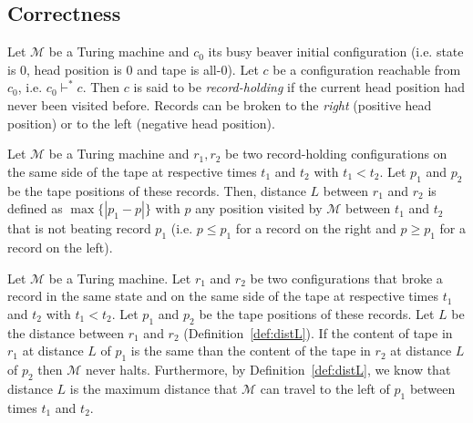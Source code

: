 \subsection{Correctness}

\begin{definition}\normalfont
  Let $\mathcal{M}$ be a Turing machine and $c_0$ its busy beaver initial configuration (i.e. state is 0, head position is 0 and tape is all-0).
  Let $c$ be a configuration reachable from $c_0$, i.e. $c_0 \vdash^* c$.
Then $c$ is said to be \textit{record-holding} if the current head position had never been visited before. Records can be broken to the \textit{right} (positive head position) or to the left (negative head position).
\end{definition}

\begin{definition}\label{def:distL}\normalfont
  Let $\mathcal{M}$ be a Turing machine and $r_1,r_2$ be two record-holding configurations on the same side of the tape at respective times $t_1$ and $t_2$ with $t_1 < t_2$. Let $p_1$ and $p_2$ be the tape positions of these records. Then, distance $L$ between $r_1$ and $r_2$ is defined as $\max\{|p_1 - p|\}$ with $p$ any position visited by $\mathcal{M}$ between $t_1$ and $t_2$ that is not beating record $p_1$ (i.e. $p \leq p_1$ for a record on the right and $p \geq p_1$ for a record on the left). 
\end{definition}

\begin{lemma}\label{lem:translated-cyclers}\normalfont 
Let $\mathcal{M}$ be a Turing machine. Let $r_1$ and $r_2$ be two configurations that broke a record in the same state and on the same side of the tape at respective times $t_1$ and $t_2$ with $t_1 < t_2$. Let $p_1$ and $p_2$ be the tape positions of these records. Let $L$ be the distance between $r_1$ and $r_2$ (Definition~\ref{def:distL}). If the content of tape in $r_1$ at distance $L$ of $p_1$ is the same than the content of the tape in $r_2$ at distance $L$ of $p_2$ then $\mathcal{M}$ never halts. Furthermore, by Definition~\ref{def:distL}, we know that distance $L$ is the maximum distance that $\mathcal{M}$ can travel to the left of $p_1$ between times $t_1$ and $t_2$.
\end{lemma}

